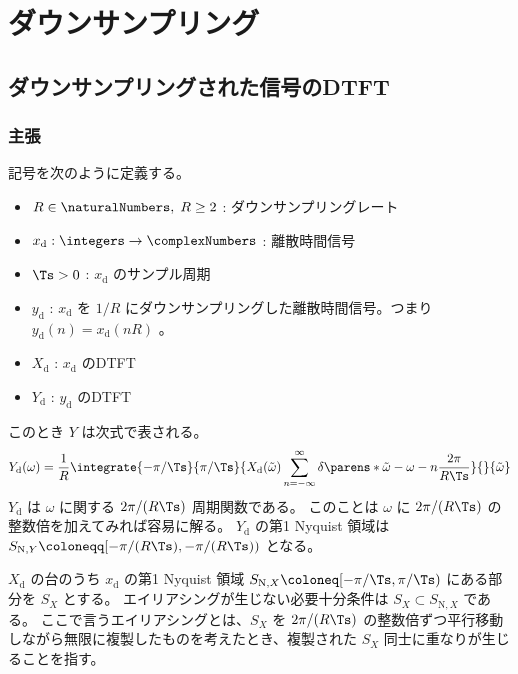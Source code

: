 \chapter{ダウンサンプリング}
    \section{ダウンサンプリングされた信号のDTFT}
        \newcommand{\xd}{x_\text{d}}
        \newcommand{\yd}{y_\text{d}}
        \newcommand{\Xd}{X_\text{d}}
        \newcommand{\Yd}{Y_\text{d}}
        \subsection{主張}
            記号を次のように定義する。
            \begin{itemize}
                \item $R\in\naturalNumbers,\;R\geq 2$ : ダウンサンプリングレート
                \item $\xd:\integers\to\complexNumbers$ : 離散時間信号
                \item $\Ts>0$ : $\xd$ のサンプル周期
                \item $\yd$ : $\xd$ を $1/R$ にダウンサンプリングした離散時間信号。つまり $\yd(n) = \xd(nR)$ 。
                \item $\Xd$ : $\xd$ のDTFT
                \item $\Yd$ : $\yd$ のDTFT
            \end{itemize}
            このとき $Y$ は次式で表される。
            \[ \Yd(\omega) = \frac{1}{R}\integrate{-\pi/\Ts}{\pi/\Ts}{\Xd(\tilde{\omega})\sum_{n=-\infty}^\infty\delta\parens*{\tilde{\omega}-\omega-n\frac{2\pi}{R\Ts}}}{}{\tilde{\omega}} \]
            $\Yd$ は $\omega$ に関する $2\pi/(R\Ts)$ 周期関数である。
            このことは $\omega$ に $2\pi/(R\Ts)$ の整数倍を加えてみれば容易に解る。
            $\Yd$ の第1 Nyquist 領域は $S_{\text{N},Y} \coloneqq [-\pi/(R\Ts),-\pi/(R\Ts))$ となる。
            \par
            $\Xd$ の台のうち $\xd$ の第1 Nyquist 領域 $S_{\text{N},X} \coloneq [-\pi/\Ts, \pi/\Ts)$ にある部分を $S_X$ とする。
            エイリアシングが生じない必要十分条件は $S_X\subset S_{\text{N},X}$ である。
            ここで言うエイリアシングとは、$S_X$ を $2\pi/(R\Ts)$ の整数倍ずつ平行移動しながら無限に複製したものを考えたとき、複製された $S_X$ 同士に重なりが生じることを指す。
